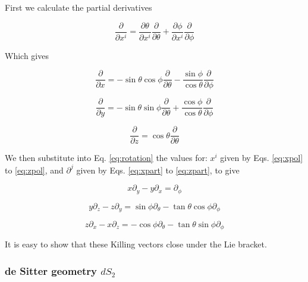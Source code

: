 \documentclass[a4paper,11pt]{article}
\numberwithin{equation}{section}
\numberwithin{figure}{section}
\begin{document}
\begin{large}
First we calculate the partial derivatives

\begin{equation}
\label{eq:part}
    \frac{\partial}{\partial x^i}=\frac{\partial \theta}{\partial x^i}\frac{\partial}{\partial \theta}+\frac{\partial \phi}{\partial x^i}\frac{\partial}{\partial \phi}
\end{equation}

Which gives

\begin{equation}
\label{eq:xpart}
\frac{\partial}{\partial x}=-\sin\theta\cos\phi\frac{\partial}{\partial \theta}-\frac{\sin\phi}{\cos\theta}\frac{\partial}{\partial \phi}
\end{equation}


\begin{equation}
\label{eq:ypart}
\frac{\partial}{\partial y}=-\sin\theta\sin\phi\frac{\partial}{\partial \theta}+\frac{\cos\phi}{\cos\theta}\frac{\partial}{\partial \phi}
\end{equation}


\begin{equation}
\label{eq:zpart}
\frac{\partial}{\partial z}=\cos\theta\frac{\partial}{\partial \theta}
\end{equation}


\newpage


We then substitute into Eq. \eqref{eq:rotation} the values for: $x^i$ given by Eqs. \eqref{eq:xpol} to \eqref{eq:zpol}, and $\partial^j$ given by Eqs. \eqref{eq:xpart} to \eqref{eq:zpart}, to give

\begin{equation}
\label{eq:xyrot}
x\partial_y-y\partial_x=\partial_\phi
\end{equation}


\begin{equation}
\label{eq:yzrot}
y\partial_z-z\partial_y=\sin\phi \partial_\theta-\tan\theta\cos\phi \partial_\phi
\end{equation}


\begin{equation}
\label{eq:zxrot}
z\partial_x-x\partial_z=-\cos\phi \partial_\theta-\tan\theta\sin\phi \partial_\phi
\end{equation}


It is easy to show that these Killing vectors close under the Lie bracket.

\subsubsection{de Sitter geometry $dS_2$}



\end{large}
\end{document}
